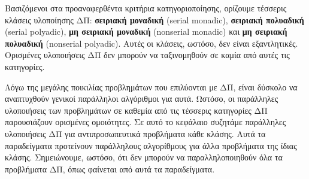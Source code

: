 \documentclass[12pt,a4paper]{article}
\begin{document}
Βασιζόμενοι στα προαναφερθέντα κριτήρια κατηγοριοποίησης, ορίζουμε
τέσσερις κλάσεις υλοποίησης ΔΠ: \textbf{σειριακή μοναδική} (\foreignlanguage{english}{serial monadic}),
\textbf{σειριακή πολυαδική} (\foreignlanguage{english}{serial polyadic}), \textbf{μη σειριακή μοναδική} (\foreignlanguage{english}{nonserial monadic}) και
\textbf{μη σειριακή πολυαδική} (\foreignlanguage{english}{nonserial polyadic}). Αυτές οι κλάσεις, ωστόσο, δεν είναι
εξαντλητικές. Ορισμένες υλοποιήσεις ΔΠ δεν μπορούν να ταξινομηθούν
σε καμία από αυτές τις κατηγορίες.

Λόγω της μεγάλης ποικιλίας προβλημάτων που επιλύονται με ΔΠ, είναι
δύσκολο να αναπτυχθούν γενικοί παράλληλοι αλγόριθμοι για αυτά.
Ωστόσο, οι παράλληλες υλοποιήσεις των προβλημάτων σε καθεμία από τις
τέσσερις κατηγορίες ΔΠ παρουσιάζουν ορισμένες ομοιότητες. Σε αυτό
το κεφάλαιο συζητάμε παράλληλες υλοποιήσεις ΔΠ για αντιπροσωπευτικά
προβλήματα κάθε κλάσης. Αυτά τα παραδείγματα προτείνουν παράλληλους
αλγορίθμους για άλλα προβλήματα της ίδιας κλάσης. Σημειώνουμε,
ωστόσο, ότι δεν μπορούν να παραλληλοποιηθούν όλα τα προβλήματα ΔΠ,
όπως φαίνεται από αυτά τα παραδείγματα.
\vspace{0.3cm}
\end{document}
